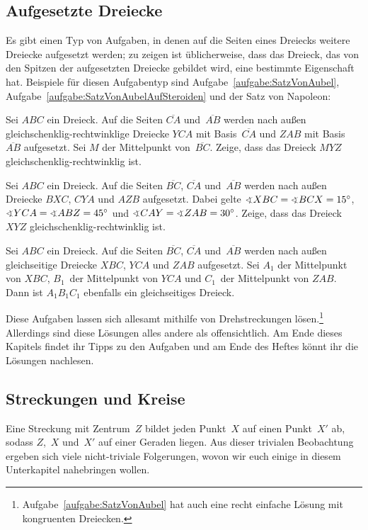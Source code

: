 \subsection*{Aufgesetzte Dreiecke}
Es gibt einen Typ von Aufgaben, in denen auf die Seiten eines Dreiecks weitere Dreiecke aufgesetzt werden; zu zeigen ist üblicherweise, dass das Dreieck, das von den Spitzen der aufgesetzten Dreiecke gebildet wird, eine bestimmte Eigenschaft hat. Beispiele für diesen Aufgabentyp sind Aufgabe~\ref{aufgabe:SatzVonAubel}, Aufgabe~\ref{aufgabe:SatzVonAubelAufSteroiden} und der Satz von Napoleon:
\begin{aufgabe*}\label{aufgabe:SatzVonAubel}
	Sei $ABC$ ein Dreieck. Auf die Seiten $\overline{CA}$ und~$\overline{AB}$ werden nach außen gleichschenklig-rechtwinklige Dreiecke $YCA$ mit Basis~$\overline{CA}$ und $ZAB$ mit Basis~$\overline{AB}$ aufgesetzt. Sei $M$ der Mittelpunkt von~$\overline{BC}$. Zeige, dass das Dreieck $MYZ$ gleichschenklig-rechtwinklig ist.
\end{aufgabe*}
\begin{aufgabe*}\label{aufgabe:SatzVonAubelAufSteroiden}
	Sei $ABC$ ein Dreieck. Auf die Seiten $\overline{BC}$, $\overline{CA}$ und~$\overline{AB}$ werden nach außen Dreiecke $BXC$, $CYA$ und $AZB$ aufgesetzt.
	Dabei gelte $\winkel XBC=\winkel BCX=15^\circ$, $\winkel YCA=\winkel ABZ=45^\circ$ und $\winkel CAY=\winkel ZAB=30^\circ$. Zeige, dass das Dreieck $XYZ$ gleichschenklig-rechtwinklig ist.
\end{aufgabe*}
\begin{satzmitnamen}
	Sei $ABC$ ein Dreieck. Auf die Seiten $\overline{BC}$, $\overline{CA}$ und~$\overline{AB}$ werden nach außen gleichseitige Dreiecke $XBC$, $YCA$ und $ZAB$ aufgesetzt. Sei $A_1$ der Mittelpunkt von $XBC$, $B_1$~der Mittelpunkt von $YCA$ und $C_1$~der Mittelpunkt von $ZAB$. Dann ist $A_1B_1C_1$ ebenfalls ein gleichseitiges Dreieck.
\end{satzmitnamen}

Diese Aufgaben lassen sich allesamt mithilfe von Drehstreckungen lösen.\footnote{Aufgabe~\ref{aufgabe:SatzVonAubel} hat auch eine recht einfache Lösung mit kongruenten Dreiecken.} Allerdings sind diese Lösungen alles andere als offensichtlich. Am Ende dieses Kapitels findet ihr Tipps zu den Aufgaben und am Ende des Heftes könnt ihr die Lösungen nachlesen.


\subsection*{Streckungen und Kreise}
Eine Streckung mit Zentrum~$Z$ bildet jeden Punkt~$X$ auf einen Punkt~$X'$ ab, sodass $Z$,~$X$ und~$X'$ auf einer Geraden liegen. Aus dieser trivialen Beobachtung ergeben sich viele nicht-triviale Folgerungen, wovon wir euch einige in diesem Unterkapitel nahebringen wollen.

